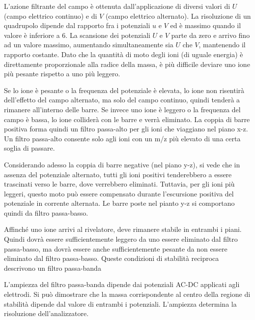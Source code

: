 
L'azione filtrante del campo è ottenuta dall'applicazione di diversi valori di $U$ (campo elettrico continuo) e di $V$ (campo elettrico alternato).
La risoluzione di un quadrupolo dipende dal rapporto fra i potenziali $u$ e $V$ ed è massimo quando il valore è inferiore a 6.
La scansione dei potenziali $U$ e $V$ parte da zero e arrivo fino ad un valore massimo, aumentando simultaneamente sia $U$ che $V$, mantenendo il rapporto costante.
Dato che la quantità di moto degli ioni (di uguale energia) è direttamente proporzionale alla radice della massa, è più difficile deviare uno ione più pesante rispetto a uno più leggero.

Se lo ione è pesante o la frequenza del potenziale è elevata, lo ione non risentirà dell'effetto del campo alternato, ma solo del campo continuo,
quindi tenderà a rimanere all'interno delle barre.
Se invece uno ione è leggero o la frequenza del campo è bassa, lo ione colliderà con le barre e verrà eliminato.
La coppia di barre positiva forma quindi un filtro passa-alto per gli ioni che viaggiano nel piano x-z.
Un filtro passa-alto consente solo agli ioni con un m/z più elevato di una certa soglia di passare.

Considerando adesso la coppia di barre negative (nel piano y-z), si vede che in assenza del potenziale alternato, tutti gli ioni positivi tenderebbero a essere trascinati verso le barre, dove verrebbero eliminati.
Tuttavia, per gli ioni più leggeri, questo moto può essere compensato durante l'escursione positiva del potenziale in corrente alternata.
Le barre poste nel pianto y-z si comportano quindi da filtro passa-basso.

Affinché uno ione arrivi al rivelatore, deve rimanere stabile in entrambi i piani.
Quindi dovrà essere sufficientemente leggero da uno essere eliminato dal filtro passa-basso, ma dovrà essere anche sufficientemente pesante da non essere eliminato dal filtro passa-basso.
Queste condizioni di stabilità reciproca descrivono un filtro passa-banda


L'ampiezza del filtro passa-banda dipende dai potenziali AC-DC applicati agli elettrodi.
Si può dimostrare che la massa corrispondente al centro della regione di stabilità dipende dal valore di entrambi i potenziali.
L'ampiezza determina la risoluzione dell'analizzatore.

